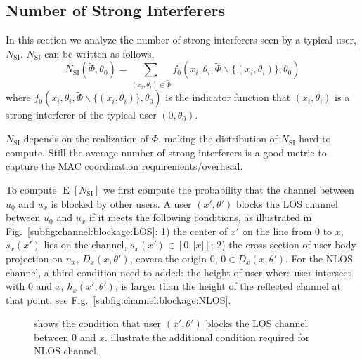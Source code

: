 \documentclass[10pt, conference, letterpaper]{IEEEtran}
\DeclareMathOperator*{\E}{\mathrm{E}}
\begin{document}
\subsection{Number of Strong Interferers}\label{section:channel:number}
In this section we analyze the number of strong interferers seen by a typical user, $N_{\mathrm{SI}}$. 
$N_{\mathrm{SI}}$ can be written as follows, 
\begin{equation}
N_{\mathrm{SI}}(\tilde{\Phi}, \theta_0) = \sum_{(x_i, \theta_i)\in \tilde{\Phi}}f_0(x_i, \theta_i, \tilde{\Phi}\backslash\{(x_i,\theta_i)\}, \theta_0)
\end{equation}
where $f_0(x_i, \theta_i, \tilde{\Phi}\backslash\{(x_i,\theta_i)\}, \theta_0)$ is the indicator function that $(x_i, \theta_i)$ is a strong interferer of the typical user $(0,\theta_0)$.

$N_{\mathrm{SI}}$ depends on the realization of $\tilde{\Phi}$, making the distribution of $N_{\mathrm{SI}}$ hard to compute. 
Still the average number of strong interferers is a good metric to capture the MAC coordination requirements/overhead.


To compute $\E[N_{\mathrm{SI}}]$ we first compute the probability that the channel between $u_0$ and $u_x$ is blocked by other users. 
A user $(x', \theta')$ blocks the LOS channel between $u_0$ and $u_x$ if it meets the following conditions, as illustrated in Fig.~\ref{subfig:channel:blockage:LOS}: 
1) the center of $x'$ on the line from $0$ to $x$, $s_x(x')$ lies on the channel, $s_x(x')\in [0,|x|]$; 
2) the cross section of user body projection on $n_x$,  $D_x(x, \theta')$, covers the origin $0$, $0 \in D_x(x, \theta')$. 
For the NLOS channel, a third condition need to added: the height of user where user intersect with $0$ and $x$, $h_x(x',\theta')$, is larger than the height of the reflected channel at that point, see Fig.~\ref{subfig:channel:blockage:NLOS}.

\begin{figure}[hbt]
	\centering
	 \hfill
	\caption[]{ shows the condition that user $(x', \theta')$ blocks the LOS channel between $0$ and $x$.  illustrate the additional condition required for NLOS channel.}
	\label{fig:channel:blockage}
\end{figure}
\end{document}
